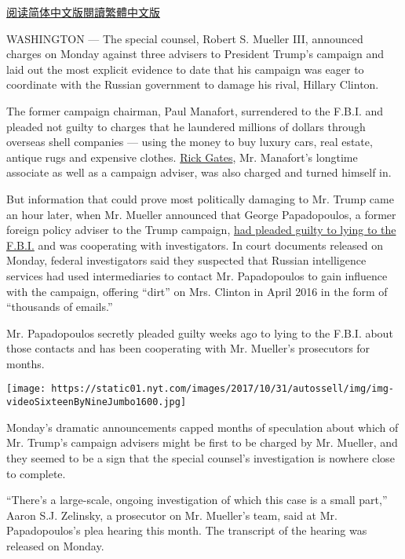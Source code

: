 \href{https://cn.nytimes.com/usa/20171031/paul-manafort-indicted/}{阅读简体中文版}\href{https://cn.nytimes.com/usa/20171031/paul-manafort-indicted/zh-hant/}{閱讀繁體中文版}

WASHINGTON --- The special counsel, Robert S. Mueller III, announced
charges on Monday against three advisers to President Trump's campaign
and laid out the most explicit evidence to date that his campaign was
eager to coordinate with the Russian government to damage his rival,
Hillary Clinton.

The former campaign chairman, Paul Manafort, surrendered to the F.B.I.
and pleaded not guilty to charges that he laundered millions of dollars
through overseas shell companies --- using the money to buy luxury cars,
real estate, antique rugs and expensive clothes.
\href{https://www.nytimes.com/2017/06/16/us/politics/rick-gates-russia.html}{Rick
Gates}, Mr. Manafort's longtime associate as well as a campaign adviser,
was also charged and turned himself in.

But information that could prove most politically damaging to Mr. Trump
came an hour later, when Mr. Mueller announced that George Papadopoulos,
a former foreign policy adviser to the Trump campaign,
\href{https://www.nytimes.com/2017/10/30/us/politics/george-papadopoulos-russia-trump.html}{had
pleaded guilty to lying to the F.B.I.} and was cooperating with
investigators. In court documents released on Monday, federal
investigators said they suspected that Russian intelligence services had
used intermediaries to contact Mr. Papadopoulos to gain influence with
the campaign, offering ``dirt'' on Mrs. Clinton in April 2016 in the
form of ``thousands of emails.''

Mr. Papadopoulos secretly pleaded guilty weeks ago to lying to the
F.B.I. about those contacts and has been cooperating with Mr. Mueller's
prosecutors for months.

\texttt{[image: https://static01.nyt.com/images/2017/10/31/autossell/img/img-videoSixteenByNineJumbo1600.jpg]}

Monday's dramatic announcements capped months of speculation about which
of Mr. Trump's campaign advisers might be first to be charged by Mr.
Mueller, and they seemed to be a sign that the special counsel's
investigation is nowhere close to complete.

``There's a large-scale, ongoing investigation of which this case is a
small part,'' Aaron S.J. Zelinsky, a prosecutor on Mr. Mueller's team,
said at Mr. Papadopoulos's plea hearing this month. The transcript of
the hearing was released on Monday.

